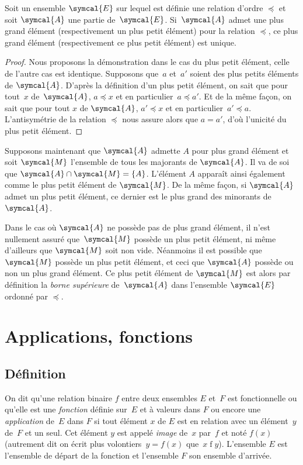 \begin{thm}
Soit un ensemble $\symcal{E}$ sur lequel est définie une relation d'ordre $\preccurlyeq$ et soit $\symcal{A}$ une partie de~$\symcal{E}$. Si~$\symcal{A}$ admet une plus grand élément (respectivement un plus petit élément) pour la relation $\preccurlyeq$, ce plus grand élément (respectivement ce plus petit élément) est unique.
\end{thm}
\begin{proof}
Nous proposons la démonstration dans le cas du plus petit élément, celle de l'autre cas est identique. Supposons que~$a$ et~$a'$ soient des plus petits éléments de $\symcal{A}$. D'après la définition d'un plus petit élément, on sait que pour tout~$x$ de~$\symcal{A}$, $a\preccurlyeq x$ et en particulier~\mbox{$a\preccurlyeq a'$}. Et de la même façon, on sait que pour tout $x$ de $\symcal{A}$, $a'\preccurlyeq x$ et en particulier~\mbox{$a'\preccurlyeq a$}. L'antisymétrie de la relation $\preccurlyeq$ nous assure alors que $a=a'$, d'où l'unicité du plus petit élément.
\end{proof}

Supposons maintenant que $\symcal{A}$ admette $A$ pour plus grand élément et soit $\symcal{M}$ l'ensemble de tous les majorants de $\symcal{A}$. Il va de soi que $\symcal{A}\cap\symcal{M}=\{A\}$. L'élément $A$ apparaît ainsi également comme le plus petit élément de $\symcal{M}$. De la même façon, si $\symcal{A}$ admet un plus petit élément, ce dernier est le plus grand des minorants de $\symcal{A}$.

\begin{alert}
Dans le cas où $\symcal{A}$ ne possède pas de plus grand élément, il n'est nullement assuré que~$\symcal{M}$ possède un plus petit élément, ni même d'ailleurs que $\symcal{M}$ soit non vide. Néanmoins il est possible que $\symcal{M}$ possède un plus petit élément, et ceci que $\symcal{A}$ possède ou non un plus grand élément. Ce plus petit élément de $\symcal{M}$ est alors par définition la \emph{borne supérieure} de~$\symcal{A}$ dans l'ensemble $\symcal{E}$ ordonné par $\preccurlyeq$. 
\end{alert}

 \section{Applications, fonctions}\label{Rfonc}
\subsection{Définition}
On dit qu'une relation binaire $f$ entre deux ensembles $E$ et~$F$ est fonctionnelle ou qu'elle est une \emph{fonction} définie sur~$E$ et à valeurs dans $F$ ou encore une \emph{application} de~$E$ dans $F$ si tout élément $x$ de $E$ est en relation avec un élément~$y$ de~$F$ et un seul. Cet élément $y$ est appelé \emph{image} de~$x$ par~$f$ et noté $f(x)$ (autrement dit on écrit plus volontiers~$y=f(x)$ que~$x \mathrel{f}y$). L'ensemble $E$ est l'ensemble de départ de la fonction et l'ensemble $F$ son ensemble d'arrivée. 

